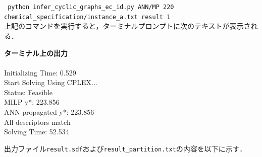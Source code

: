 \documentclass[11pt, titlepage, dvipdfmx, twoside]{jarticle}
\begin{document}
{\tt 
 python infer\_cyclic\_graphs\_ec\_id.py 
ANN/MP
220 \\
 \phantom{python }
chemical\_specification/instance\_a.txt
result
1
 }\\


上記のコマンドを実行すると，ターミナルプロンプトに次のテキストが表示される．

\bigskip

\begin{oframed}
{\bf ターミナル上の出力}\\\\
 Initializing Time: 0.529  \\
Start Solving Using CPLEX...\\
Status: Feasible 		\\
MILP y*: 223.856 		\\
ANN propagated y*: 223.856 \\
All descriptors match    	\\
Solving Time: 52.534       
\end{oframed}

出力ファイル{\tt result.sdf}および{\tt result\_partition.txt}の内容を以下に示す．

\bigskip
\end{document}
